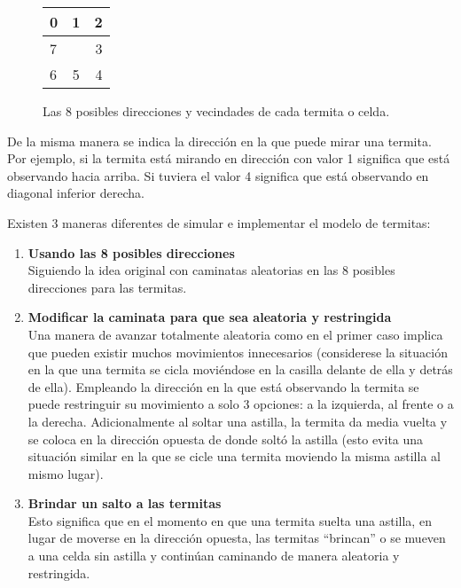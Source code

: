\begin{figure}
  \begin{center}
    \begin{tabular}{| l | c | r |}
      \hline
      0 & 1 & 2 \\ \hline
      7 &   & 3 \\ \hline
      6 & 5 & 4 \\
      \hline
    \end{tabular}
  \end{center}
  \caption{Las 8 posibles direcciones y vecindades de cada termita o celda.}
  \label{fig:dirsposibles1}
\end{figure}

De la misma manera se indica la dirección en la que puede mirar una termita. Por ejemplo, si la termita está mirando en dirección con valor 1 significa que está observando hacia arriba. Si tuviera el valor 4 significa que está observando en diagonal inferior derecha.

Existen 3 maneras diferentes de simular e implementar el modelo de termitas:

\begin{enumerate}
  \item \textbf{Usando las 8 posibles direcciones} \\
    Siguiendo la idea original con caminatas aleatorias en las 8 posibles direcciones para las termitas.


  \item \textbf{Modificar la caminata para que sea aleatoria y restringida} \\
    Una manera de avanzar totalmente aleatoria como en el primer caso implica que pueden existir muchos movimientos innecesarios (considerese la situación en la que una termita se cicla moviéndose en la casilla delante de ella y detrás de ella).
    Empleando la dirección en la que está observando la termita se puede restringuir su movimiento a solo 3 opciones: a la izquierda, al frente o a la derecha.
    Adicionalmente al soltar una astilla, la termita da media vuelta y se coloca en la dirección opuesta de donde soltó la astilla (esto evita una situación similar en la que se cicle una termita moviendo la misma astilla al mismo lugar).

  \item \textbf{Brindar un salto a las termitas} \\
    Esto significa que en el momento en que una termita suelta una astilla, en lugar de moverse en la dirección opuesta, las termitas “brincan” o se mueven a una celda sin astilla y continúan caminando de manera aleatoria y restringida.
\end{enumerate}

